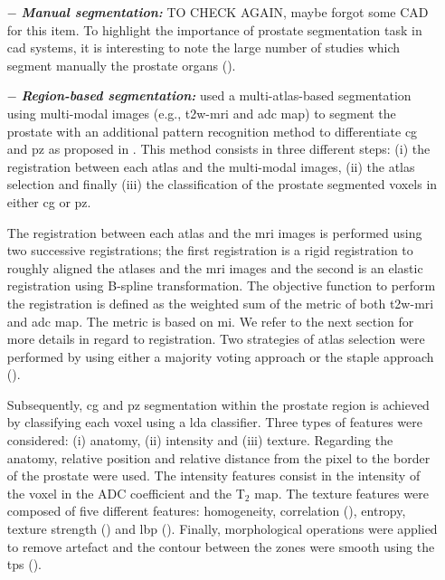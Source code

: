 \begin{enumerate}[leftmargin=*]

\item[$-$] \textbf{\textit{Manual segmentation:}}{\color{red} TO CHECK AGAIN, maybe forgot some CAD for this item.} To highlight the importance of prostate segmentation task in \ac{cad} systems, it is interesting to note the large number of studies which segment manually the prostate organs (\cite{Artan2009,Artan2010,Matulewicz2013,Niaf2011,Niaf2012,Ozer2009,Ozer2010,Puech2009,Vos2008,Vos2008a}).

\item[$-$] \textbf{\textit{Region-based segmentation:}} \cite{Litjens2012} used a multi-atlas-based segmentation using multi-modal images (e.g., \ac{t2w}-\ac{mri} and \ac{adc} map) to segment the prostate with an additional pattern recognition method to differentiate \ac{cg} and \ac{pz} as proposed in \cite{Litjens2012a}. This method consists in three different steps: (i) the registration between each atlas and the multi-modal images, (ii) the atlas selection and finally (iii) the classification of the prostate segmented voxels in either \ac{cg} or \ac{pz}. 

The registration between each atlas and the \ac{mri} images is performed using two successive registrations; the first registration is a rigid registration to roughly aligned the atlases and the \ac{mri} images and the second is an elastic registration using B-spline transformation. The objective function to perform the registration is defined as the weighted sum of the metric of both \ac{t2w}-\ac{mri} and \ac{adc} map. The metric is based on \ac{mi}. We refer to the next section for more details in regard to registration. Two strategies of atlas selection were performed by using either a majority voting approach or the \ac{staple} approach (\cite{Warfield2004}).

Subsequently,  \ac{cg} and \ac{pz} segmentation within the prostate region is achieved by classifying each voxel using a \ac{lda} classifier. Three types of features were considered: (i) anatomy, (ii) intensity and (iii) texture. Regarding the anatomy, relative position and relative distance from the pixel to the border of the prostate were used. The intensity features consist in the intensity of the voxel in the ADC coefficient and the T$_2$ map. The texture features were composed of five different features: homogeneity, correlation (\cite{Amadasun1989}), entropy, texture strength (\cite{Li2005a}) and \ac{lbp} (\cite{Ojala1996}). Finally, morphological operations were applied to remove artefact and the contour between the zones were smooth using the \ac{tps} (\cite{Bookstein1989}).


\end{enumerate}
